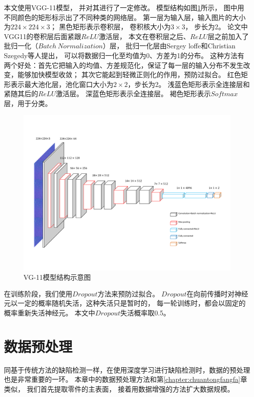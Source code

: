 本文使用VGG-11\cite{simonyan2014very}模型，
并对其进行了一定修改。
模型结构如图\ref{fig:VGG}所示，
图中用不同颜色的矩形标示出了不同种类的网络层。
第一层为输入层，输入图片的大小为$224\times224\times3$；
黑色矩形表示卷积层，
卷积核大小为$3\times3$，
步长为2。
论文中VGG11的卷积层后面紧跟$ReLU$激活层，
本文在卷积层之后、$ReLU$层之前加入了批归一化（$Batch~Normalization$）层，
批归一化层由Sergey loffe和Christian Szegedy等人提出，
可以将数据归一化至均值为0、方差为1的分布。
这种方法有两个好处：首先它把输入的均值、方差规范化，保证了每一层的输入分布不发生改变，能够加快模型收敛；
其次它能起到轻微正则化的作用，预防过拟合。
红色矩形表示最大池化层，池化窗口大小为$2\times2$，步长为2。
浅蓝色矩形表示全连接层和紧随其后的$ReLU$激活层。
深蓝色矩形表示全连接层。
褐色矩形表示$Softmax$层，用于分类。

\begin{figure}[htbp]
\centering
\includegraphics[width=1.0\linewidth]{figures/VGG.pdf}
\caption{VG-11模型结构示意图}
\label{fig:VGG}
\end{figure}

在训练阶段，我们使用$Dropout$方法来预防过拟合。
$Dropout$在向前传播时对神经元以一定的概率随机失活，这种失活只是暂时的，
每一轮训练时，都会以固定的概率重新失活神经元。
本文中$Dropout$失活概率取0.5。


\section{数据预处理}

同基于传统方法的缺陷检测一样，在使用深度学习进行缺陷检测时，数据的预处理也是非常重要的一环。
本章中的数据预处理方法和第\ref{chapter:chuantongfangfa}章类似，
我们首先提取零件的主表面，
接着用数据增强的方法扩大数据规模。


